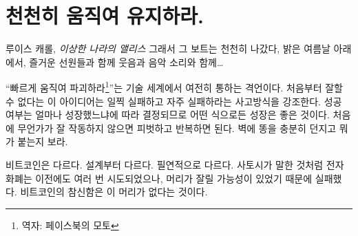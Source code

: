 \chapter{천천히 움직여 유지하라.}
\label{les:18}

\begin{chapquote}{루이스 캐롤, \textit{이상한 나라의 앨리스}}
그래서 그 보트는 천천히 나갔다, 밝은 여름날 아래에서, 즐거운 선원들과 함께 웃음과 음악 소리와 함께\ldots
\end{chapquote}

\begin{comment}
It might be a dead mantra, but \enquote{move fast and break things} is still how
much of the tech world operates. The idea that it doesn't matter if you
get things right the first time is a basic pillar of the \textit{fail early,
fail often} mentality. Success is measured in growth, so as long as you
are growing everything is fine. If something doesn't work at first you
simply pivot and iterate. In other words: throw enough shit against the
wall and see what sticks.
\end{comment}
\enquote{빠르게 움직여 파괴하라\footnote{역자: 페이스북의 모토}}는 기술 세계에서 여전히 통하는 격언이다.
처음부터 잘할 수 없다는 이 아이디어는 일찍 실패하고 자주 실패하라는 사고방식을 강조한다.
성공 여부는 얼마나 성장했느냐에 따라 결정되므로 어떤 식으로든 성장은 좋은 것이다. 
처음에 무언가가 잘 작동하지 않으면 피벗하고 반복하면 된다. 
벽에 똥을 충분히 던지고 뭐가 붙는지 보라.

\begin{comment}
Bitcoin is very different. It is different by design. It is different
out of necessity. As Satoshi pointed out, e-currency has been tried
many times before, and all previous attempts have failed because there
was a head which could be cut off. The novelty of Bitcoin is that it is
a beast without heads.
\end{comment}
비트코인은 다르다. 설계부터 다르다. 필연적으로 다르다.
사토시가 말한 것처럼 전자 화폐는 이전에도 여러 번 시도되었으나, 
머리가 잘릴 가능성이 있었기 때문에 실패했다.
비트코인의 참신함은 이 머리가 없다는 것이다.

